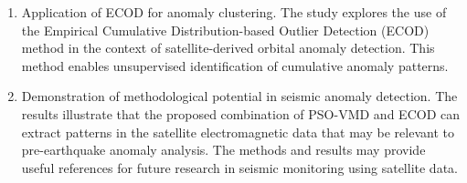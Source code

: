 \documentclass[3p,authoryear,preprint,12pt]{elsarticle}
\begin{document}
\begin{enumerate}
	\item {Application of ECOD for anomaly clustering. The study explores the use of the Empirical Cumulative Distribution-based Outlier Detection (ECOD) method in the context of satellite-derived orbital anomaly detection. This method enables unsupervised identification of cumulative anomaly patterns.}
	
	\item {Demonstration of methodological potential in seismic anomaly detection. The results illustrate that the proposed combination of PSO-VMD and ECOD can extract patterns in the satellite electromagnetic data that may be relevant to pre-earthquake anomaly analysis. The methods and results may provide useful references for future research in seismic monitoring using satellite data.}
\end{enumerate}
\end{document}
